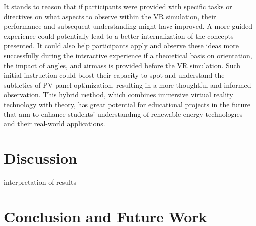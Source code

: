 \documentclass[draft, final]{vutinfth} %
\begin{document}
It stands to reason that if participants were provided with specific tasks or directives on what aspects to observe within the VR simulation, their performance and subsequent understanding might have improved. A more guided experience could potentially lead to a better internalization of the concepts presented. It could also help participants apply and observe these ideas more successfully during the interactive experience if a theoretical basis on orientation, the impact of angles, and airmass is provided before the VR simulation. Such initial instruction could boost their capacity to spot and understand the subtleties of PV panel optimization, resulting in a more thoughtful and informed observation. This hybrid method, which combines immersive virtual reality technology with theory, has great potential for educational projects in the future that aim to enhance students' understanding of renewable energy technologies and their real-world applications.

\chapter{Discussion}
interpretation of results

\chapter{Conclusion and Future Work}

\backmatter

\listoffigures %



\printindex

\printglossaries


% 

\end{document}
